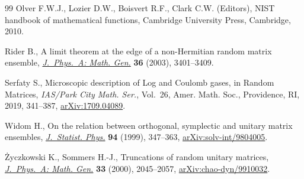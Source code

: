 \documentclass[pdftex]{sigma}
\numberwithin{equation}{section}
\newcommand{\1}{\chi}
\begin{document}
\begin{thebibliography}{99}
Olver F.W.J., Lozier D.W., Boisvert R.F., Clark C.W. (Editors), N{IST} handbook
 of mathematical functions, Cambridge University Press, Cambridge, 2010.

Rider B., A limit theorem at the edge of a non-{H}ermitian random matrix
 ensemble, \href{https://doi.org/10.1088/0305-4470/36/12/331}{\textit{J.~Phys.~A: Math. Gen.}} \textbf{36} (2003), 3401--3409.

Serfaty S., Microscopic description of {L}og and {C}oulomb gases, in Random
 {M}atrices, \textit{IAS/Park City Math. Ser.}, Vol.~26, Amer. Math. Soc.,
 Providence, RI, 2019, 341--387, \href{https://arxiv.org/abs/1709.04089}{arXiv:1709.04089}.

Widom H., On the relation between orthogonal, symplectic and unitary matrix
 ensembles, \href{https://doi.org/10.1023/A:1004516918143}{\textit{J.~Statist. Phys.}} \textbf{94} (1999), 347--363,
 \href{https://arxiv.org/abs/solv-int/9804005}{arXiv:solv-int/9804005}.

\.{Z}yczkowski K., Sommers H.-J., Truncations of random unitary matrices,
 \href{https://doi.org/10.1088/0305-4470/33/10/307}{\textit{J.~Phys.~A: Math. Gen.}} \textbf{33} (2000), 2045--2057,
 \href{https://arxiv.org/abs/chao-dyn/9910032}{arXiv:chao-dyn/9910032}.

\end{thebibliography}\LastPageEnding
\end{document}
